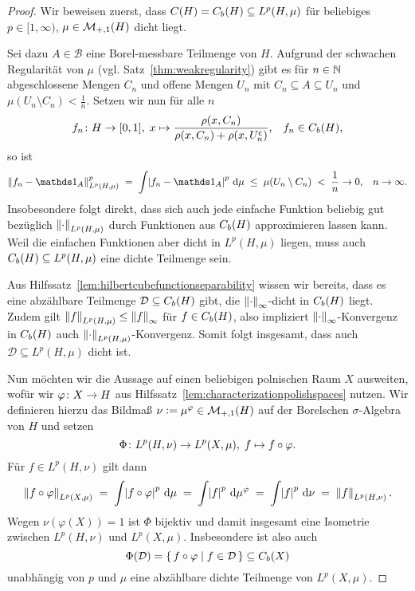 \documentclass[../main/main.tex]{subfiles}
\begin{document}
	\begin{proof}
		Wir beweisen zuerst, dass $C(H) = C_b(H) \subseteq L^p(H, \mu)$ für beliebiges 
		$p \in [1, \infty)$, $\mu \in \mathcal{M}_{+,1}(H)$ dicht liegt. 
		
		Sei dazu $A \in \mathcal{B}$ eine Borel-messbare Teilmenge von $H$. 
		Aufgrund der schwachen Regularität von $\mu$ (vgl. Satz~\ref{thm:weakregularity}) 
		gibt es für $n \in \mathbb{N}$ abgeschlossene Mengen $C_n$ und offene Mengen 
		$U_n$ mit $C_n \subseteq A \subseteq U_n$ und 
		$\mu(U_n \setminus C_n) < \frac{1}{n}$. Setzen wir nun für alle $n$
		\[f_n \colon H \to [0, 1], \; x \mapsto \frac{\rho(x, C_n)}{\rho(x, C_n) + 
				\rho(x, U_n^\mathsf{c})}  \text{,} \quad f_n \in C_b(H) \text{,}\]
		so ist
		\[ \norm{f_n - \indfct_A}_{L^p(H, \mu)}^p \; = \; 
		\measureint{}{\abs{f_n - \indfct_A}^p}{\mu} \; \leq \; 
		\mu(U_n \setminus C_n) \; < \; \frac{1}{n} \to 0 \text{,} 
		\quad n \to \infty \text{.}\]
		Insobesondere folgt direkt, dass sich auch jede einfache Funktion 
		beliebig gut bezüglich $\left\lVert\cdot\right\rVert_{L^p(H, \mu)}$ durch Funktionen aus $C_b(H)$ 
		approximieren lassen kann. Weil die einfachen Funktionen aber dicht 
		in $L^p(H, \mu)$ liegen, muss auch $C_b(H) \subseteq L^p(H, \mu)$ eine 
		dichte Teilmenge sein.
		
		Aus Hilfssatz~\ref{lem:hilbertcubefunctionseparability} wissen wir 
		bereits, dass es eine abzählbare Teilmenge $\mathcal{D}\subseteq C_b(H)$ 
		gibt, die $\left\lVert\cdot\right\rVert_\infty$-dicht in $C_b(H)$ liegt. Zudem gilt 
		$\left\lVert f\right\rVert_{L^p(H, \mu)} \leq \left\lVert f\right\rVert_\infty$ für $f \in C_b(H)$, also impliziert 
		$\left\lVert\cdot\right\rVert_\infty$-Konvergenz in $C_b(H)$ auch $\left\lVert\cdot\right\rVert_{L^p(H, \mu)}$-Konvergenz. 
		Somit folgt insgesamt, dass auch $\mathcal{D} \subseteq L^p(H, \mu)$ dicht ist.
		
		Nun möchten wir die Aussage auf einen beliebigen polnischen Raum $X$ ausweiten, 
		wofür wir $\varphi \colon X \to H$ aus Hilfssatz~\ref{lem:characterizationpolishspaces} nutzen.
		Wir definieren hierzu das Bildmaß $\nu \vcentcolon = \mu^\varphi \in \mathcal{M}_{+,1}(H)$ 
		auf der Borelschen $\sigma$-Algebra von $H$ und setzen
		\[\Phi \colon L^p(H, \nu) \to L^p(X, \mu), \; f \mapsto f \circ \varphi  \text{.}\]
		Für $f \in L^p(H, \nu)$ gilt dann
		\[ \left\lVert f \circ \varphi\right\rVert_{L^p(X, \mu)} 
		\; = \; \int_{} \, \left| f \circ \varphi \right|^p \, \mathrm{d}\mu 
		\; = \; \int_{} \, \left| f \right|^p \, \mathrm{d}\mu^\varphi 
		\; = \; \int_{} \, \left| f \right|^p \, \mathrm{d}\nu 
		\; = \; \left\lVert f\right\rVert_{L^p(H, \nu)} \text{.} \]
		Wegen $\nu(\varphi(X)) = 1$ ist $\Phi$ bijektiv und damit insgesamt eine Isometrie 
		zwischen $L^p(H, \nu)$ und $L^p(X, \mu)$. Insbesondere ist also auch 
		\[\Phi(\mathcal{D}) = \left\{\, f \circ \varphi \; \middle| \; f \in \mathcal{D} \,\right\} \subseteq C_b(X)\]
		unabhängig von $p$ und $\mu$ eine abzählbare dichte Teilmenge von $L^p(X, \mu)$.
	\end{proof}
\end{document}
